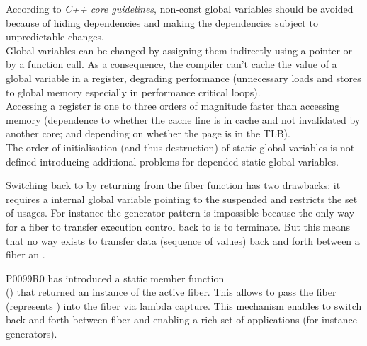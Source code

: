 \label{problem_gpub}

According to \emph{C++ core guidelines}\cite{coreguidlines}, non-const global
variables should be avoided because of hiding dependencies and making the
dependencies subject to unpredictable changes.\\
Global variables can be changed by assigning them indirectly using a pointer or
by a function call. As a consequence, the compiler can't cache the value of a
global variable in a register, degrading performance (unnecessary
loads and stores to global memory especially in performance critical loops).\\
Accessing a register is one to three orders of magnitude faster than accessing
memory (dependence to whether the cache line is in cache and not invalidated by
another core; and depending on whether the page is in the TLB).\\
The order of initialisation (and thus destruction) of static global
variables is not defined introducing additional problems for depended static
global variables.\\


Switching back to \main by returning from the fiber function has two drawbacks:
it requires a internal global variable pointing to the suspended \main and
restricts the set of usages.
For instance the generator pattern is impossible because the only way
for a fiber to transfer execution control back to \main is to terminate. But
this means that no way exists to transfer data (sequence of values) back and
forth between a fiber an \main.\\


P0099R0\cite{P0099R0} has introduced a static member function\\
() that returned an instance of the active
fiber. This allows to pass the fiber  (represents \main) into the fiber
 via lambda capture. This mechanism enables to switch back and forth
between fiber and \main enabling a rich set of applications (for instance
generators).

